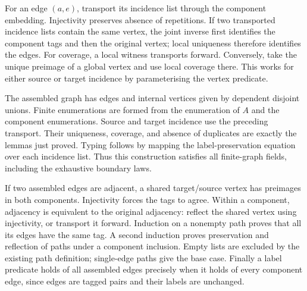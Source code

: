 

For an edge $(a,e)$, transport its incidence list through the component
embedding. Injectivity preserves absence of repetitions. If two transported
incidence lists contain the same vertex, the joint inverse first identifies
the component tags and then the original vertex; local uniqueness therefore
identifies the edges. For coverage, a local witness transports forward.
Conversely, take the unique preimage of a global vertex and use local
coverage there. This works for either source or target incidence by
parameterising the vertex predicate.





The assembled graph has edges and internal vertices given by dependent
disjoint unions. Finite enumerations are formed from the enumeration of $A$
and the component enumerations. Source and target incidence use the preceding
transport. Their uniqueness, coverage, and absence of duplicates are exactly
the lemmas just proved. Typing follows by mapping the label-preservation
equation over each incidence list. Thus this construction satisfies all
finite-graph fields, including the exhaustive boundary laws.


If two assembled edges are adjacent, a shared target/source vertex has
preimages in both components. Injectivity forces the tags to agree.
Within a component, adjacency is equivalent to the original adjacency:
reflect the shared vertex using injectivity, or transport it forward.
Induction on a nonempty path proves that all its edges have the same tag.
A second induction proves preservation and reflection of paths under a
component inclusion. Empty lists are excluded by the existing path definition;
single-edge paths give the base case. Finally a label predicate holds of
all assembled edges precisely when it holds of every component edge,
since edges are tagged pairs and their labels are unchanged.


